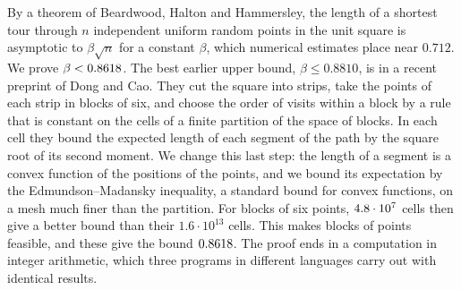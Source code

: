 By a theorem of Beardwood, Halton and Hammersley, the length of a shortest tour through $n$ independent uniform random points in the unit square is asymptotic to $\beta\sqrt n$ for a constant $\beta$, which numerical estimates place near $0.712$. We prove $\beta<0.8618$. The best earlier upper bound, $\beta\le0.8810$, is in a recent preprint of Dong and Cao. They cut the square into strips, take the points of each strip in blocks of six, and choose the order of visits within a block by a rule that is constant on the cells of a finite partition of the space of blocks. In each cell they bound the expected length of each segment of the path by the square root of its second moment. We change this last step: the length of a segment is a convex function of the positions of the points, and we bound its expectation by the Edmundson--Madansky inequality, a standard bound for convex functions, on a mesh much finer than the partition. For blocks of six points, $4.8\cdot10^{7}$ cells then give a better bound than their $1.6\cdot10^{13}$ cells. This makes blocks of \MainPoints{} points feasible, and these give the bound $0.8618$. The proof ends in a computation in integer arithmetic, which three programs in different languages carry out with identical results.
